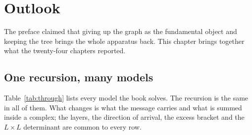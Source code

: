 \chapter{Outlook}
\label{ch:outlook}

The preface claimed that giving up the graph as the fundamental object and
keeping the tree brings the whole apparatus back. This chapter brings
together what the twenty-four chapters reported.

\section{One recursion, many models}
\label{sec:onerecursion}

Table~\ref{tab:through} lists every model the book solves. The recursion is
the same in all of them. What changes is what the message carries and what is
summed inside a complex; the layers, the direction of arrival, the excess
bracket and the $L\times L$ determinant are common to every row.

